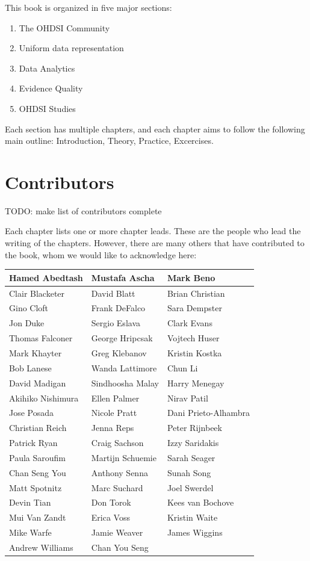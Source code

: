 \documentclass[11pt]{book}
\providecommand{\tightlist}{%
  \setlength{\itemsep}{0pt}\setlength{\parskip}{0pt}}
\theoremstyle{definition}
\theoremstyle{definition}
\theoremstyle{definition}
\theoremstyle{remark}
\begin{document}
This book is organized in five major sections:

\begin{enumerate}
\def\labelenumi{\Roman{enumi})}
\tightlist
\item
  The OHDSI Community
\item
  Uniform data representation
\item
  Data Analytics
\item
  Evidence Quality
\item
  OHDSI Studies
\end{enumerate}

Each section has multiple chapters, and each chapter aims to follow the following main outline: Introduction, Theory, Practice, Excercises.

\hypertarget{contributors}{%
\section*{Contributors}\label{contributors}}

TODO: make list of contributors complete

Each chapter lists one or more chapter leads. These are the people who lead the writing of the chapters. However, there are many others that have contributed to the book, whom we would like to acknowledge here:

\begin{tabular}{l|l|l}
\hline
Hamed Abedtash & Mustafa Ascha & Mark Beno\\
\hline
Clair Blacketer & David Blatt & Brian Christian\\
\hline
Gino Cloft & Frank DeFalco & Sara Dempster\\
\hline
Jon Duke & Sergio Eslava & Clark Evans\\
\hline
Thomas Falconer & George Hripcsak & Vojtech Huser\\
\hline
Mark Khayter & Greg Klebanov & Kristin Kostka\\
\hline
Bob Lanese & Wanda Lattimore & Chun Li\\
\hline
David Madigan & Sindhoosha Malay & Harry Menegay\\
\hline
Akihiko Nishimura & Ellen Palmer & Nirav Patil\\
\hline
Jose Posada & Nicole Pratt & Dani Prieto-Alhambra\\
\hline
Christian Reich & Jenna Reps & Peter Rijnbeek\\
\hline
Patrick Ryan & Craig Sachson & Izzy Saridakis\\
\hline
Paula Saroufim & Martijn Schuemie & Sarah Seager\\
\hline
Chan Seng You & Anthony Senna & Sunah Song\\
\hline
Matt Spotnitz & Marc Suchard & Joel Swerdel\\
\hline
Devin Tian & Don Torok & Kees van Bochove\\
\hline
Mui Van Zandt & Erica Voss & Kristin Waite\\
\hline
Mike Warfe & Jamie Weaver & James Wiggins\\
\hline
Andrew Williams & Chan You Seng & \\
\hline
\end{tabular}
\end{document}
